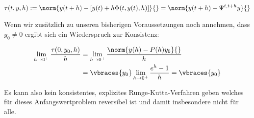 \begin{solution}
  \begin{align*}
    \tau(t,y,h) := \norm{y(t+h)-[y(t)+h\Phi(t,y(t),h)]}{} =
    \norm{y(t+h)- \Psi^{t,t+h}y}{}
  \end{align*}

  Wenn wir zusätzlich zu unseren bisherigen Voraussetzungen noch annehmen, dass
  $y_0 \neq 0$ ergibt sich ein Wiederspruch zur Konsistenz:

  \begin{align*}
    \lim_{h\rightarrow 0^+} \frac{\tau(0,y_0,h)}{h}
    &=\lim_{h\rightarrow 0^+} \frac{\norm{y(h)-P(h)y_0}{}}{h} \\
    &=\vbraces{y_0} \lim_{h\rightarrow 0^+} \frac{e^h-1}{h} = \vbraces{y_0}
  \end{align*}

  Es kann also kein konsistentes, explizites Runge-Kutta-Verfahren geben welches
  für dieses Anfangswertproblem reversibel ist und damit insbesondere nicht für alle.
\end{solution}
